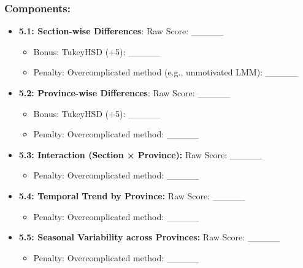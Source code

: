 \documentclass[
  10pt,
]{article}
\providecommand{\tightlist}{%
  \setlength{\itemsep}{0pt}\setlength{\parskip}{0pt}}
\begin{document}
\subsubsection{Components:}\label{components-2}

\begin{itemize}
\tightlist
\item
  \textbf{5.1: Section-wise Differences}: Raw Score: \_\_\_\_\_

  \begin{itemize}
  \tightlist
  \item
    Bonus: TukeyHSD (+5): \_\_\_\_\_\\
  \item
    Penalty: Overcomplicated method (e.g., unmotivated LMM):
    \_\_\_\_\_\\
  \end{itemize}
\item
  \textbf{5.2: Province-wise Differences}: Raw Score: \_\_\_\_\_

  \begin{itemize}
  \tightlist
  \item
    Bonus: TukeyHSD (+5): \_\_\_\_\_\\
  \item
    Penalty: Overcomplicated method: \_\_\_\_\_\\
  \end{itemize}
\item
  \textbf{5.3: Interaction (Section × Province):} Raw Score: \_\_\_\_\_

  \begin{itemize}
  \tightlist
  \item
    Penalty: Overcomplicated method: \_\_\_\_\_\\
  \end{itemize}
\item
  \textbf{5.4: Temporal Trend by Province:} Raw Score: \_\_\_\_\_

  \begin{itemize}
  \tightlist
  \item
    Penalty: Overcomplicated method: \_\_\_\_\_\\
  \end{itemize}
\item
  \textbf{5.5: Seasonal Variability across Provinces:} Raw Score:
  \_\_\_\_\_

  \begin{itemize}
  \tightlist
  \item
    Penalty: Overcomplicated method: \_\_\_\_\_
  \end{itemize}
\end{itemize}
\end{document}
